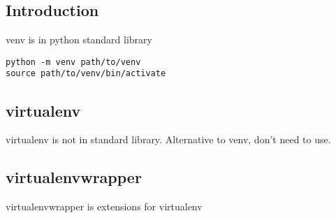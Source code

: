
\subsection{Introduction}


venv is in python standard library

\begin{verbatim}
python -m venv path/to/venv
source path/to/venv/bin/activate
\end{verbatim}
  
\subsection{virtualenv}

virtualenv is not in standard library. Alternative to venv, don't need to use.

\subsection{virtualenvwrapper}

virtualenvwrapper is extensions for virtualenv


